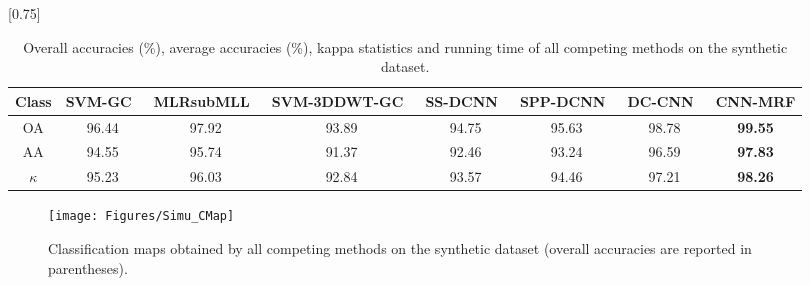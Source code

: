 \documentclass[journal]{IEEEtran}
\begin{document}
		\begin{table*}[htp]
			\caption{\label{table_simu} {{Overall accuracies (\%), average accuracies (\%), kappa statistics and running time of all competing methods on the synthetic dataset.}}}
			\begin{center}
				{\normalsize
					\scalebox{0.75}[0.75]
					{
						\begin{tabular}{|c||c|c|c|c|c|c|c|}
							\hline
							Class   & SVM-GC~\cite{tarabalka2010svm}   & MLRsubMLL~\cite{li2012spectral}  & SVM-3DDWT-GC~\cite{cao2017integration}  &  SS-DCNN~\cite{yue2015spectral} & SPP-DCNN~\cite{yue2016deep} & DC-CNN~\cite{zhang2017spectral} & CNN-MRF \\ 
							\hline
							OA      & 96.44    & 97.92      & 93.89     &    94.75  &  95.63    & 98.78 & \bf{99.55}  \\ 
							\hline
							AA      & 94.55    & 95.74      & 91.37     &    92.46  &  93.24   & 96.59  & \bf{97.83}  \\ 
							\hline
							$\kappa$   & 95.23    & 96.03      & 92.84     & 93.57   & 94.46   & 97.21  & \bf{98.26}  \\ 
\hline 
						\end{tabular}
					}
				}
			\end{center}
		\end{table*}	
		
		\begin{figure*}
			\centering
			\texttt{[image: Figures/Simu\_CMap]}
			\caption{{{Classification maps obtained by all competing methods on the synthetic dataset (overall accuracies are reported in parentheses).}}}\label{fig_simu}
		\end{figure*}
		
		
		
\end{document}
